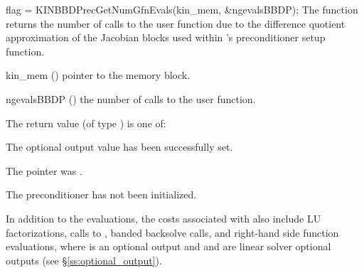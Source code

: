{
  flag = KINBBDPrecGetNumGfnEvals(kin\_mem, \&ngevalsBBDP);
}
{
  The function  returns the
  number of calls to the user  function due to the
  difference quotient approximation of the Jacobian blocks used within
  {\kinbbdpre}'s preconditioner setup function.
}
{
  \begin{args}[ngevalsBBDP]
  \item[kin\_mem] ()
    pointer to the {\kinsol} memory block.
  \item[ngevalsBBDP] ()
    the number of calls to the user  function.
  \end{args}
}
{
  The return value  (of type ) is one of:
  \begin{args}
  \item[\id{KINLS\_SUCCESS}]
    The optional output value has been successfully set.
  \item[\id{KINLS\_MEM\_NULL}]
    The  pointer was .
  \item[\Id{KINLS\_PMEM\_NULL}]
    The {\kinbbdpre} preconditioner has not been initialized.
  \end{args}
}
{}


In addition to the   evaluations,
the costs associated with {\kinbbdpre} also include  LU
factorizations,  calls to ,  banded
backsolve calls, and  right-hand side function evaluations,
where  is an optional {\kinsol} output and  and
 are linear solver optional outputs (see \S\ref{ss:optional_output}).
